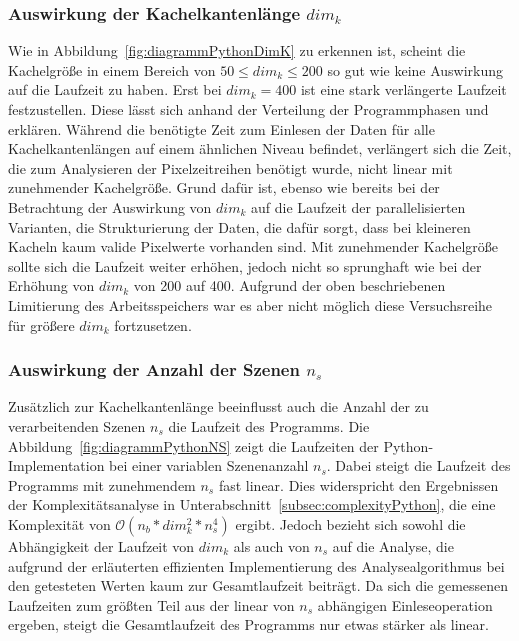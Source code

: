 \subsubsection{Auswirkung der Kachelkantenlänge $dim_k$}
Wie in Abbildung~\ref{fig:diagrammPythonDimK} zu erkennen ist, scheint die Kachelgröße in einem Bereich von $50 \leq dim_k \leq 200$ so gut wie keine Auswirkung auf die Laufzeit zu haben. Erst bei $dim_k = 400$ ist eine stark verlängerte Laufzeit festzustellen. Diese lässt sich anhand der Verteilung der Programmphasen \grqq und \grqq erklären. Während die benötigte Zeit zum Einlesen der Daten für alle Kachelkantenlängen auf einem ähnlichen Niveau befindet, verlängert sich die Zeit, die zum Analysieren der Pixelzeitreihen benötigt wurde, nicht linear mit zunehmender Kachelgröße. Grund dafür ist, ebenso wie bereits bei der Betrachtung der Auswirkung von $dim_k$ auf die Laufzeit der parallelisierten Varianten, die Strukturierung der Daten, die dafür sorgt, dass bei kleineren Kacheln kaum valide Pixelwerte vorhanden sind. Mit zunehmender Kachelgröße sollte sich die Laufzeit weiter erhöhen, jedoch nicht so sprunghaft wie bei der Erhöhung von $dim_k$ von 200 auf 400. Aufgrund der oben beschriebenen Limitierung des Arbeitsspeichers war es aber nicht möglich diese Versuchsreihe für größere $dim_k$ fortzusetzen.

\subsubsection{Auswirkung der Anzahl der Szenen $n_s$}
Zusätzlich zur Kachelkantenlänge beeinflusst auch die Anzahl der zu verarbeitenden Szenen $n_s$ die Laufzeit des Programms. Die Abbildung~\ref{fig:diagrammPythonNS} zeigt die Laufzeiten der Python-Implementation bei einer variablen Szenenanzahl $n_s$. Dabei steigt die Laufzeit des Programms mit zunehmendem $n_s$ fast linear. Dies widerspricht den Ergebnissen der Komplexitätsanalyse in Unterabschnitt~\ref{subsec:complexityPython}, die eine Komplexität von $\mathcal{O}(n_b * dim_k^2 * n_s^4)$ ergibt. Jedoch bezieht sich sowohl die Abhängigkeit der Laufzeit von $dim_k$ als auch von $n_s$ auf die Analyse, die aufgrund der erläuterten effizienten Implementierung des Analysealgorithmus bei den getesteten Werten kaum zur Gesamtlaufzeit beiträgt. Da sich die gemessenen Laufzeiten zum größten Teil aus der linear von $n_s$ abhängigen Einleseoperation ergeben, steigt die Gesamtlaufzeit des Programms nur etwas stärker als linear. 

